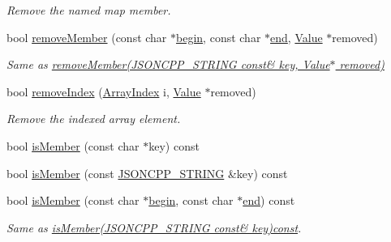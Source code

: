 \begin{DoxyCompactItemize}
\begin{DoxyCompactList}\small\item\em Remove the named map member. \end{DoxyCompactList}\item 
bool \hyperlink{classJson_1_1Value_a49c91af727d6b4eb0af02a81bb2def87_a49c91af727d6b4eb0af02a81bb2def87}{remove\+Member} (const char $\ast$\hyperlink{classJson_1_1Value_a015459a3950c198d63a2d3be8f5ae296_a015459a3950c198d63a2d3be8f5ae296}{begin}, const char $\ast$\hyperlink{classJson_1_1Value_a3e443cd0ef24f7e028b175e47ee045e0_a3e443cd0ef24f7e028b175e47ee045e0}{end}, \hyperlink{classJson_1_1Value}{Value} $\ast$removed)
\begin{DoxyCompactList}\small\item\em Same as \hyperlink{classJson_1_1Value_ae385ecef98427970df525ee876e9f54a_ae385ecef98427970df525ee876e9f54a}{remove\+Member(\+J\+S\+O\+N\+C\+P\+P\+\_\+\+S\+T\+R\+I\+N\+G const\& key, Value$\ast$ removed)} \end{DoxyCompactList}\item 
bool \hyperlink{classJson_1_1Value_ae9e67e08a85a2f3be3396ec0f4c47f65_ae9e67e08a85a2f3be3396ec0f4c47f65}{remove\+Index} (\hyperlink{classJson_1_1Value_a184a91566cccca7b819240f0d5561c7d_a184a91566cccca7b819240f0d5561c7d}{Array\+Index} i, \hyperlink{classJson_1_1Value}{Value} $\ast$removed)
\begin{DoxyCompactList}\small\item\em Remove the indexed array element. \end{DoxyCompactList}\item 
bool \hyperlink{classJson_1_1Value_ad6d4df2227321bab05e86667609a7fad_ad6d4df2227321bab05e86667609a7fad}{is\+Member} (const char $\ast$key) const
\item 
bool \hyperlink{classJson_1_1Value_a0c2cd838217b23ee6bde8135de1b30d9_a0c2cd838217b23ee6bde8135de1b30d9}{is\+Member} (const \hyperlink{json_8h_a1e723f95759de062585bc4a8fd3fa4be_a1e723f95759de062585bc4a8fd3fa4be}{J\+S\+O\+N\+C\+P\+P\+\_\+\+S\+T\+R\+I\+NG} \&key) const
\item 
bool \hyperlink{classJson_1_1Value_a2007e1e51f21f44ecf1f13e4a1c567b9_a2007e1e51f21f44ecf1f13e4a1c567b9}{is\+Member} (const char $\ast$\hyperlink{classJson_1_1Value_a015459a3950c198d63a2d3be8f5ae296_a015459a3950c198d63a2d3be8f5ae296}{begin}, const char $\ast$\hyperlink{classJson_1_1Value_a3e443cd0ef24f7e028b175e47ee045e0_a3e443cd0ef24f7e028b175e47ee045e0}{end}) const
\begin{DoxyCompactList}\small\item\em Same as \hyperlink{classJson_1_1Value_a0c2cd838217b23ee6bde8135de1b30d9_a0c2cd838217b23ee6bde8135de1b30d9}{is\+Member(\+J\+S\+O\+N\+C\+P\+P\+\_\+\+S\+T\+R\+I\+N\+G const\& key)const}. \end{DoxyCompactList}\item 

\end{DoxyCompactItemize}
